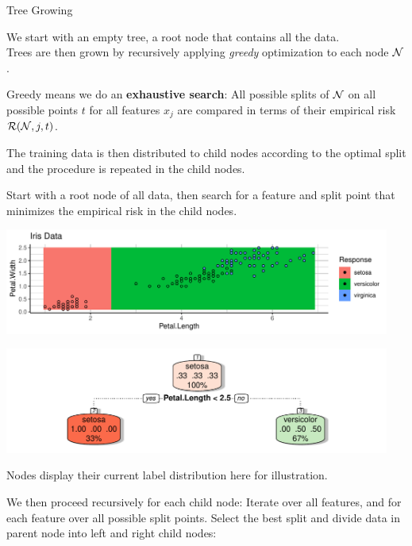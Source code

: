 \documentclass[11pt,compress,t,notes=noshow, xcolor=table]{beamer}
\newenvironment{knitrout}{}{} %
\begin{document}
\begin{vbframe}{Tree Growing}

We start with an empty tree, a root node that contains all the data.\\
Trees are then grown by recursively applying \emph{greedy} optimization to each node $\mathcal{N}$.\\
\lz

Greedy means we do an \textbf{exhaustive search}: All possible splits of $\mathcal{N}$ on all possible points $t$ for all features $x_j$ are compared in terms of their empirical risk $\mathcal{R}(\mathcal{N}, j, t)$.

The training data is then distributed to child nodes according to the optimal split and the procedure is repeated in the child nodes.

\framebreak

Start with a root node of all data, then search for a feature and split point that minimizes the empirical risk in the child nodes.
\begin{knitrout}\scriptsize
{}\color{fgcolor}

{\centering \includegraphics[width=0.95\textwidth]{figure/cart_treegrow_1}

}




{\centering \includegraphics[width=0.95\textwidth]{figure/cart_treegrow_12}

}



\end{knitrout}
Nodes display their current label distribution here for illustration.


\framebreak

We then proceed recursively for each child node:
Iterate over all features, and for each feature over all possible split points. Select the best split and divide data in parent node into left and right child nodes:
\begin{knitrout}\scriptsize
{}\color{fgcolor}


\end{knitrout}
\end{vbframe}
\end{document}
